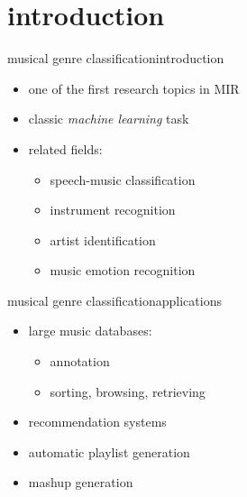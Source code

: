     \section[intro]{introduction}
        \begin{frame}{musical genre classification}{introduction}
            \begin{itemize}
                \item	one of the first research topics in MIR
                \item<2->	classic \textit{machine learning }task
                \item<3->	related fields:
                    \begin{itemize}
                        \item	speech-music classification
                        \item	instrument recognition
                        \item   artist identification
                        \item   music emotion recognition
                    \end{itemize}
            \end{itemize}
        \end{frame}

        \begin{frame}{musical genre classification}{applications}
            \begin{itemize}
                \item	large music databases:
                    \begin{itemize}
                        \item	annotation
                        \item	sorting, browsing, retrieving
                    \end{itemize}
                \item recommendation systems
                \item	automatic playlist generation
                \item	mashup generation
            \end{itemize}
        \end{frame}

